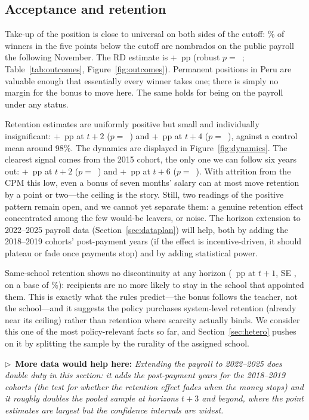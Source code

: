 \documentclass[11pt]{article}
\newcommand{\dataneed}[1]{\par\medskip\noindent\begin{small}\noindent
$\triangleright$~\textbf{More data would help here:} \emph{#1}\end{small}\par\medskip}
\begin{document}
\subsection{Acceptance and retention}

Take-up of the position is close to universal on both sides of the cutoff:
\AcceptMean\% of winners in the five points below the cutoff are nombrados on
the public payroll the following November. The RD estimate is
+\AcceptRF~pp (robust $p=$~\AcceptP; Table~\ref{tab:outcomes},
Figure~\ref{fig:outcomes}). Permanent positions in Peru are valuable enough
that essentially every winner takes one; there is simply no margin for the
bonus to move here. The same holds for being on the payroll under any
status.

Retention estimates are uniformly positive but small and individually
insignificant: +\RetainTwoRF~pp at $t+2$ ($p=$~\RetainTwoP) and
+\RetainFourRF~pp at $t+4$ ($p=$~\RetainFourP), against a control mean around
98\%. The dynamics are displayed in Figure~\ref{fig:dynamics}. The clearest
signal comes from the 2015 cohort, the only one we can follow six years out:
+\RetainTwoFifteenRF~pp at $t+2$ ($p=$~\RetainTwoFifteenP) and
+\NombSixFifteenRF~pp at $t+6$ ($p=$~\NombSixFifteenP). With attrition from
the CPM this low, even a bonus of seven months' salary can at most move
retention by a point or two---the ceiling is the story. Still, two readings
of the positive pattern remain open, and we cannot yet separate them: a
genuine retention effect concentrated among the few would-be leavers, or
noise. The horizon extension to 2022--2025 payroll data
(Section~\ref{sec:dataplan}) will help, both by adding the 2018--2019
cohorts' post-payment years (if the effect is incentive-driven, it should
plateau or fade once payments stop) and by adding statistical power.

Same-school retention shows no discontinuity at any horizon
(\SameschRF~pp at $t+1$, SE \SameschSE, on a base of \SameschMean\%):
recipients are no more likely to stay in the school that appointed them. This is exactly what
the rules predict---the bonus follows the teacher, not the school---and it
suggests the policy purchases system-level retention (already near its
ceiling) rather than retention where scarcity actually binds. We consider
this one of the most policy-relevant facts so far, and
Section~\ref{sec:hetero} pushes on it by splitting the sample by the rurality
of the assigned school.

\dataneed{Extending the payroll to 2022--2025 does double duty in this
section: it adds the post-payment years for the 2018--2019 cohorts (the test
for whether the retention effect fades when the money stops) and it roughly
doubles the pooled sample at horizons $t+3$ and beyond, where the point
estimates are largest but the confidence intervals are widest.}
\end{document}
